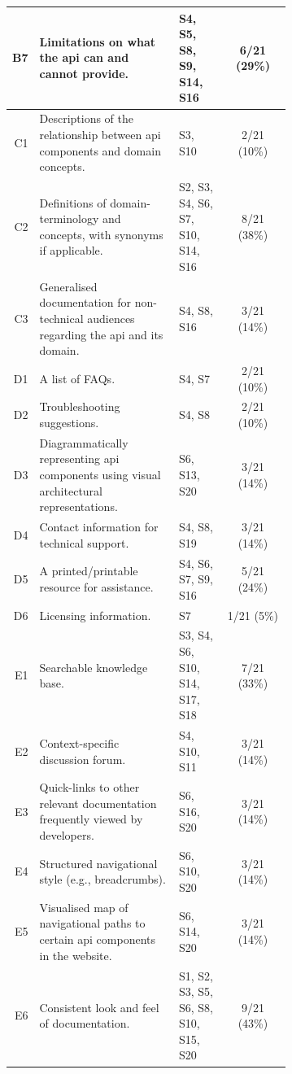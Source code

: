 \begin{small}
\begin{longtable}{rp{0.5\linewidth}|p{0.175\linewidth}|c}
  B7&
  Limitations on what the \gls{api} can and cannot provide.
  &
  S4, S5, S8, S9, S14, S16 &
  6/21 (29\%)\\

  \midrule
  C1&
  Descriptions of the relationship between \gls{api} components and domain concepts.
  &
  S3, S10 &
  2/21 (10\%)\\

  C2&
  Definitions of domain-terminology and concepts, with synonyms if applicable.
  &
  S2, S3, S4, S6, S7, S10, S14, S16 &
  8/21 (38\%)\\

  C3&
  Generalised documentation for non-technical audiences regarding the \gls{api} and its domain.
  &
  S4, S8, S16 &
  3/21 (14\%)\\

  \midrule
  D1&
  A list of FAQs.
  &
  S4, S7 &
  2/21 (10\%)\\

  D2&
  Troubleshooting suggestions.
  &
  S4, S8 &
  2/21 (10\%)\\

  D3&
  Diagrammatically representing \gls{api} components using visual architectural representations.
  &
  S6, S13, S20 &
  3/21 (14\%)\\

  D4&
  Contact information for technical support.
  &
  S4, S8, S19 &
  3/21 (14\%)\\

  D5&
  A printed/printable resource for assistance.
  &
  S4, S6, S7, S9, S16 &
  5/21 (24\%)\\

  D6&
  Licensing information.
  &
  S7 &
  1/21 (5\%)\\

  \midrule
  E1&
  Searchable knowledge base.
  &
  S3, S4, S6, S10, S14, S17, S18 &
  7/21 (33\%)\\

  E2&
  Context-specific discussion forum.
  &
  S4, S10, S11 &
  3/21 (14\%)\\

  E3&
  Quick-links to other relevant documentation frequently viewed by developers.
  &
  S6, S16, S20 &
  3/21 (14\%)\\

  E4&
  Structured navigational style (e.g., breadcrumbs).
  &
  S6, S10, S20 &
  3/21 (14\%)\\

  E5&
  Visualised map of navigational paths to certain \gls{api} components in the website.
  &
  S6, S14, S20 &
  3/21 (14\%)\\

  {E6}&
  {Consistent look and feel of documentation.}
  &
  {S1, S2, S3, S5, S6, S8, S10, S15, S20} &
  {9/21 (43\%)}\\
\end{longtable}
\end{small}